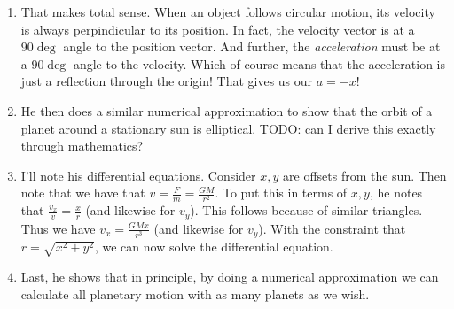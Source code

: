 \begin{enumerate}
  \item That makes total sense. When an object follows circular motion,
  its velocity is always perpindicular to its position. In fact, the
  velocity vector is at a $90\deg$ angle to the position vector. And
  further, the \emph{acceleration} must be at a $90\deg$ angle to the
  velocity. Which of course means that the acceleration is just a
  reflection through the origin! That gives us our $a = -x$!

  \item He then does a similar numerical approximation to show that the
  orbit of a planet around a stationary sun is elliptical. TODO: can I
  derive this exactly through mathematics?

  \item I'll note his differential equations. Consider $x, y$ are offsets
  from the sun. Then note that we have that $v = \frac{F}{m} =
  \frac{GM}{r^2}$. To put this in terms of $x, y$, he notes that
  $\frac{v_x}{v} = \frac{x}{r}$ (and likewise for $v_y$). This follows
  because of similar triangles. Thus we have $v_x = \frac{GMx}{r^3}$
  (and likewise for $v_y$). With the constraint that $r = \sqrt{x^2 +
  y^2}$, we can now solve the differential equation.

  \item Last, he shows that in principle, by doing a numerical
  approximation we can calculate all planetary motion with as many
  planets as we wish.

\end{enumerate}
